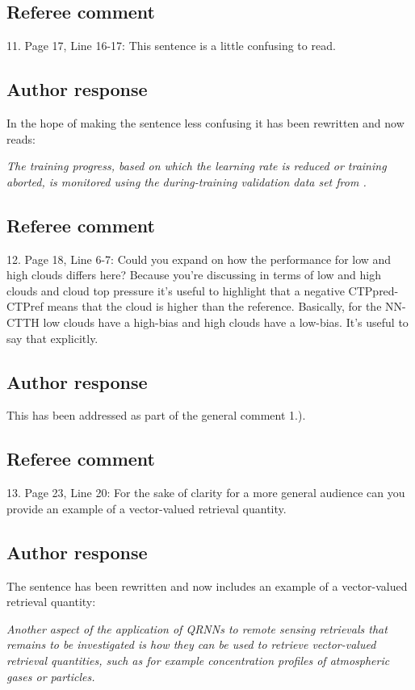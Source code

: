 \documentclass[journal abbreviation, manuscript]{copernicus}
\begin{document}
\subsection*{Referee comment}

11. Page 17, Line 16-17: This sentence is a little confusing to read.

\subsection*{Author response}

In the hope of making the sentence less confusing it has been rewritten
and now reads:

\vspace{0.5em}
\textit{
The training progress, based on which the
learning rate is reduced or training aborted, is monitored using the
during-training validation data set from \cite{hakansson}.
}

\subsection*{Referee comment}

12.  Page 18, Line 6-7:  Could you expand on how the performance for low and high
clouds differs here?  Because you’re discussing in terms of low and high clouds and
cloud top pressure it’s useful to highlight that a negative CTPpred-CTPref means that
the cloud is higher than the reference.  Basically, for the NN-CTTH low clouds have a
high-bias and high clouds have a low-bias. It’s useful to say that explicitly.

\subsection*{Author response}

This has been addressed as part of the general comment 1.).

\subsection*{Referee comment}

13.  Page 23, Line 20:  For the sake of clarity for a more general audience can you
provide an example of a vector-valued retrieval quantity.

\subsection*{Author response}

The sentence has been rewritten and now includes an example of a
vector-valued retrieval quantity:

\vspace{0.5em}
\textit{
Another aspect of the application of QRNNs to remote sensing retrievals that
remains to be investigated is how they can be used to retrieve vector-valued
retrieval quantities, such as for example concentration profiles of atmospheric gases or
particles.
}



\end{document}
